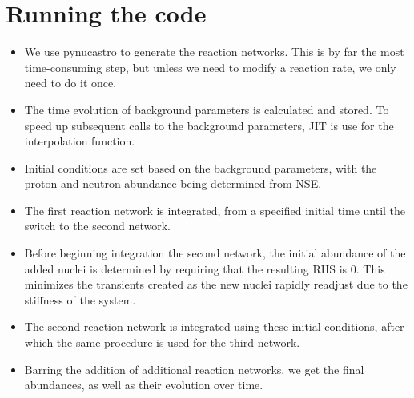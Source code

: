 \section{Running the code}
\label{sec:structure}

\begin{itemize}
    \item We use pynucastro to generate the reaction networks. This is by far the most time-consuming step, but unless we need to modify a reaction rate, we only need to do it once.
    \item The time evolution of background parameters is calculated and stored. To speed up subsequent calls to the background parameters, JIT is use for the interpolation function.
    \item Initial conditions are set based on the background parameters, with the proton and neutron abundance being determined from NSE.
    \item The first reaction network is integrated, from a specified initial time until the switch to the second network. 
    \item Before beginning integration the second network, the initial abundance of the added nuclei is determined by requiring that the resulting RHS is 0. This minimizes the transients created as the new nuclei rapidly readjust due to the stiffness of the system.
    \item The second reaction network is integrated using these initial conditions, after which the same procedure is used for the third network.
    \item Barring the addition of additional reaction networks, we get the final abundances, as well as their evolution over time.
\end{itemize}

